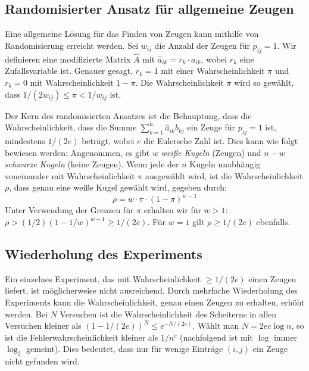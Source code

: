 \documentclass{scrartcl}
\numberwithin{equation}{section}
\begin{document}
\subsection{Randomisierter Ansatz für allgemeine Zeugen}
Eine allgemeine Lösung für das Finden von Zeugen kann mithilfe von Randomisierung erreicht werden. Sei $w_{ij}$ die Anzahl der Zeugen für $p_{ij}=1$. Wir definieren eine modifizierte Matrix $\hat{A}$ mit $\hat{a}_{ik} = r_k \cdot a_{ik}$, wobei $r_k$ eine Zufallsvariable ist. Genauer gesagt, $r_k=1$ mit einer Wahrscheinlichkeit $\pi$ und $r_k=0$ mit Wahrscheinlichkeit $1-\pi$. Die Wahrscheinlichkeit $\pi$ wird so gewählt, dass $1/(2w_{ij}) \le \pi < 1/w_{ij}$ ist.

Der Kern des randomisierten Ansatzes ist die Behauptung, dass die Wahrscheinlichkeit, dass die Summe $\sum_{k=1}^{n} \hat{a}_{ik} b_{kj}$ ein Zeuge für $p_{ij}=1$ ist, mindestens $1/(2e)$ beträgt, wobei $e$ die Eulersche Zahl ist. Dies kann wie folgt bewiesen werden: Angenommen, es gibt $w$ \textit{weiße Kugeln} (Zeugen) und $n-w$ \textit{schwarze Kugeln} (keine Zeugen). Wenn jede der $n$ Kugeln unabhängig voneinander mit Wahrscheinlichkeit $\pi$ ausgewählt wird, ist die Wahrscheinlichkeit $\rho$, dass genau eine weiße Kugel gewählt wird, gegeben durch:
$$\rho = w \cdot \pi \cdot (1-\pi)^{w-1}$$
Unter Verwendung der Grenzen für $\pi$ erhalten wir für $w > 1$: $\rho > (1/2)(1-1/w)^{w-1} \ge 1/(2e)$. Für $w=1$ gilt $\rho \ge 1/(2e)$ ebenfalls.

\subsection{Wiederholung des Experiments}
Ein einzelnes Experiment, das mit Wahrscheinlichkeit $\ge 1/(2e)$ einen Zeugen liefert, ist möglicherweise nicht ausreichend. Durch mehrfache Wiederholung des Experiments kann die Wahrscheinlichkeit, genau einen Zeugen zu erhalten, erhöht werden. Bei $N$ Versuchen ist die Wahrscheinlichkeit des Scheiterns in allen Versuchen kleiner als $(1-1/(2e))^N \le e^{-N/(2e)}$. Wählt man $N = 2ec \log n$, so ist die Fehlerwahrscheinlichkeit kleiner als $1/n^c$ (nachfolgend ist mit $\log$ immer $\log_2$ gemeint). Dies bedeutet, dass nur für wenige Einträge $(i, j)$ ein Zeuge nicht gefunden wird.
\end{document}
